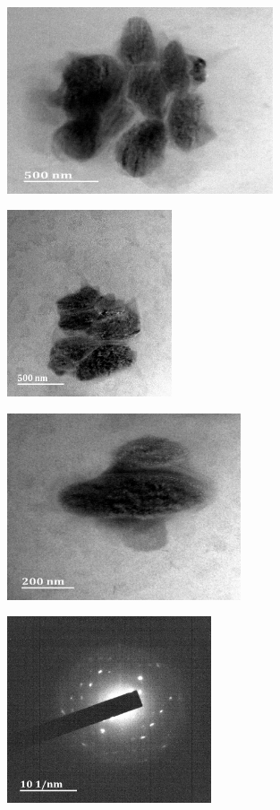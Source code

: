 \documentclass[12pt]{report}
\begin{document}
\begin{figure}[H]
\centering

\begin{subfigure}{.45\textwidth}
    \includegraphics[height=5.5cm, width=\textwidth]{diffraction_image_11.png}
\end{subfigure}
\hspace{-1em}
\begin{subfigure}{.45\textwidth}
    \includegraphics[height=5.5cm, width=\textwidth]{diffraction_image_12.png}
\end{subfigure}
\par\bigskip
\begin{subfigure}{.45\textwidth}
    \includegraphics[height=5.5cm, width=\textwidth]{diffraction_image_13.png}
\end{subfigure}
\hspace{-1em}
\begin{subfigure}{.45\textwidth}
    \includegraphics[height=5.5cm, width=\textwidth]{afff_solution_in_hdpe.png}
\end{subfigure}


\end{figure}
\end{document}
